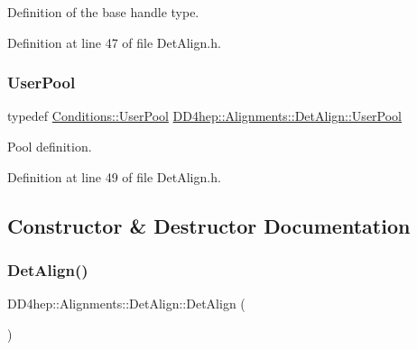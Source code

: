 Definition of the base handle type. 



Definition at line 47 of file Det\+Align.\+h.

\hypertarget{class_d_d4hep_1_1_alignments_1_1_det_align_a0595e4c0ee7f454cf5e9c5d32b718aca}{}\label{class_d_d4hep_1_1_alignments_1_1_det_align_a0595e4c0ee7f454cf5e9c5d32b718aca} 
\subsubsection{\texorpdfstring{User\+Pool}{UserPool}}
{\footnotesize\ttfamily typedef \hyperlink{class_d_d4hep_1_1_conditions_1_1_user_pool}{Conditions\+::\+User\+Pool} \hyperlink{class_d_d4hep_1_1_alignments_1_1_det_align_a0595e4c0ee7f454cf5e9c5d32b718aca}{D\+D4hep\+::\+Alignments\+::\+Det\+Align\+::\+User\+Pool}}



Pool definition. 



Definition at line 49 of file Det\+Align.\+h.



\subsection{Constructor \& Destructor Documentation}
\hypertarget{class_d_d4hep_1_1_alignments_1_1_det_align_a32f656225a62fa9b6b789464bfea22b3}{}\label{class_d_d4hep_1_1_alignments_1_1_det_align_a32f656225a62fa9b6b789464bfea22b3} 
\subsubsection{\texorpdfstring{Det\+Align()}{DetAlign()}\hspace{0.1cm}{\footnotesize\ttfamily [1/5]}}
{\footnotesize\ttfamily D\+D4hep\+::\+Alignments\+::\+Det\+Align\+::\+Det\+Align (\begin{DoxyParamCaption}{ }\end{DoxyParamCaption})\hspace{0.3cm}{\ttfamily [inline]}}



